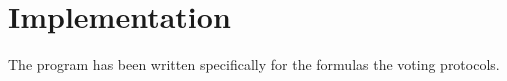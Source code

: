 \chapter{Implementation}
\label{04}


The program has been written specifically for the formulas the voting protocols. 



